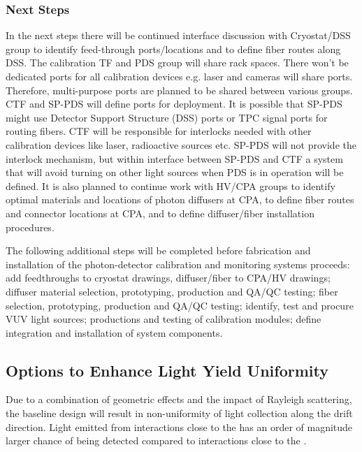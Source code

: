 \subsubsection{Next Steps}

In the next steps there will be continued interface discussion with Cryostat/DSS group to identify feed-through ports/locations and to define fiber routes along DSS. The calibration TF and PDS group will share rack spaces. There won't be dedicated ports for all calibration devices e.g. laser and cameras will share ports. 
Therefore, multi-purpose ports are planned to be shared between various groups. CTF and SP-PDS will define ports for deployment. It is possible that SP-PDS might use Detector Support Structure (DSS) ports or TPC signal ports for routing fibers. CTF will be responsible for interlocks needed with other calibration devices 
like laser, radioactive sources etc. SP-PDS will not provide the interlock mechanism, but within interface between SP-PDS and CTF a system that will avoid turning  on other light sources when PDS is in operation will be defined.
It is also planned to continue work with HV/CPA groups to identify optimal materials and locations of photon diffusers at CPA, to define fiber routes and connector locations  at CPA, and to define diffuser/fiber installation procedures.

The following additional steps will be completed before fabrication and installation of the photon-detector calibration and monitoring systems proceeds: add feedthroughs to cryostat drawings, diffuser/fiber to CPA/HV drawings; diffuser material selection, prototyping, production and QA/QC testing; fiber selection, prototyping, production and QA/QC testing; identify, test and procure VUV light sources; productions and testing of calibration modules; define integration and installation of system components.



\subsection{Options to Enhance Light Yield Uniformity}
\label{sec:fdsp-pd-enh}
 
Due to a combination of geometric effects and the impact of Rayleigh scattering, the baseline  design will result in non-uniformity of light collection along the drift direction. Light emitted from interactions close to the  has an order of magnitude larger chance of being detected compared to interactions close to the . 

